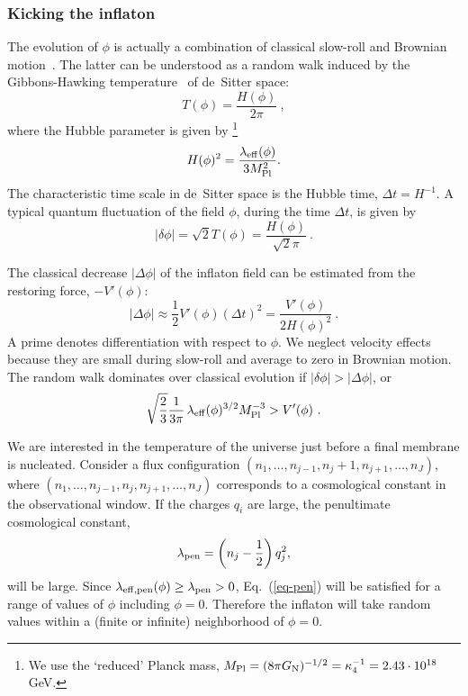 \documentclass[12pt]{article}
\begin{document}
\subsubsection{Kicking the inflaton}

The evolution of $\phi$ is actually a combination of classical
slow-roll and Brown\-ian motion~\cite{Vil83b,Lin86a}.  The latter can
be understood as a random walk induced by the Gibbons-Hawking
temperature~\cite{GibHaw77a} of de~Sitter space:
\begin{equation}
T(\phi) = \frac{H(\phi)}{2\pi} \ ,
\end{equation}
where the Hubble parameter is given by%
%
\footnote{We use the `reduced' Planck mass, $M_{\rm Pl} = (8 \pi
G_{\rm N})^{-1/2} = \kappa_4^{-1} = 2.43 \cdot 10^{18}$ GeV.} %
%
\begin{equation}
H(\phi)^2 = \frac{\lambda_{\rm eff}(\phi)}{3 M_{\rm Pl}^2}.
\end{equation}
The characteristic time scale in de~Sitter space is the Hubble time,
$\Delta t = H^{-1}$.  A typical quantum fluctuation of the field
$\phi$, during the time $\Delta t$, is given by~\cite{Lin82b}
\begin{equation}
|\delta \phi| = \sqrt{2} T(\phi) = \frac{H(\phi)}{\sqrt{2} \pi} \ .
\end{equation}

The classical decrease $|\Delta \phi|$ of the inflaton field can be
estimated from the restoring force, $-V'(\phi)$:
\begin{equation}
|\Delta \phi| \approx \frac{1}{2} V'(\phi) (\Delta t)^2 =
 \frac{V'(\phi)}{2H(\phi)^2} \ .
\end{equation}
A prime denotes differentiation with respect to $\phi$.  We neglect
velocity effects because they are small during slow-roll and average
to zero in Brown\-ian motion.  The random walk dominates over
classical evolution if $|\delta \phi| > |\Delta \phi|$, or
\begin{equation}
\sqrt{\frac{2}{3}} \frac{1}{3\pi}\,
\lambda_{\rm eff}(\phi)^{3/2} M_{\rm Pl}^{-3} > V'(\phi) \ .
\label{eq-pen}
\end{equation}

We are interested in the temperature of the universe just before a
final membrane is nucleated.  Consider a flux configuration $(n_1,
\ldots, n_{j-1}, n_j+1, n_{j+1}, \ldots, n_J)$, where $(n_1, \ldots,
n_{j-1}, n_j, n_{j+1}, \ldots, n_J)$ corresponds to a cosmological
constant in the observational window.  If the charges $q_i$ are large,
the penultimate cosmological constant,
\begin{equation}
\lambda_{\rm pen} = \left(n_j - \frac{1}{2} \right) q_j^2,
\end{equation}
will be large.  Since $\lambda_{\rm eff,pen}(\phi) \geq \lambda_{\rm
pen} > 0$, Eq.~(\ref{eq-pen}) will be satisfied for a range of values
of $\phi$ including $\phi=0$.  Therefore the inflaton will take random
values within a (finite or infinite) neighborhood of $\phi=0$.
\end{document}

